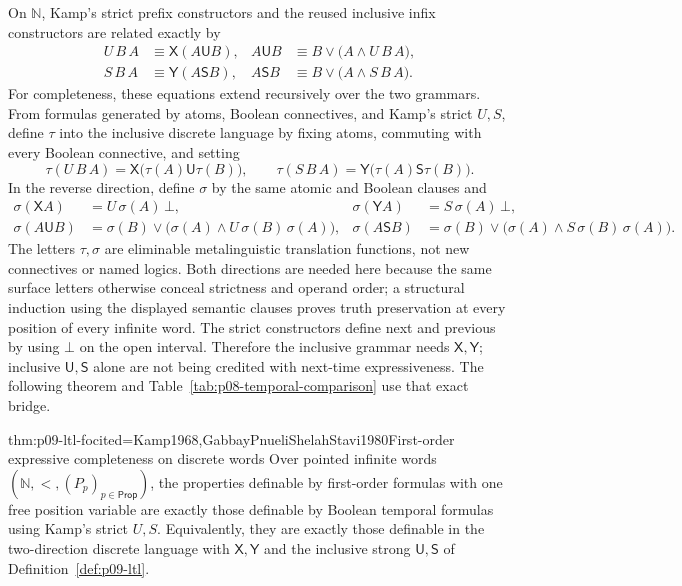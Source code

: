 On \(\mathbb N\), Kamp's strict prefix constructors and the reused inclusive
infix constructors are related exactly by
\[
\begin{aligned}
 U\,B\,A&\equiv\mathsf X(A\mathbin{\mathsf U}B),
 &A\mathbin{\mathsf U}B&\equiv
   B\lor\bigl(A\land U\,B\,A\bigr),\\
 S\,B\,A&\equiv\mathsf Y(A\mathbin{\mathsf S}B),
 &A\mathbin{\mathsf S}B&\equiv
   B\lor\bigl(A\land S\,B\,A\bigr).
\end{aligned}
\]
For completeness, these equations extend recursively over the two grammars.
From formulas generated by atoms, Boolean connectives, and Kamp's strict
\(U,S\), define \(\tau\) into the inclusive discrete language by fixing atoms,
commuting with every Boolean connective, and setting
\[
 \tau(U\,B\,A)=
 \mathsf X\bigl(\tau(A)\mathbin{\mathsf U}\tau(B)\bigr),
 \qquad
 \tau(S\,B\,A)=
 \mathsf Y\bigl(\tau(A)\mathbin{\mathsf S}\tau(B)\bigr).
\]
In the reverse direction, define \(\sigma\) by the same atomic and Boolean
clauses and
\[
\begin{aligned}
 \sigma(\mathsf XA)&=U\,\sigma(A)\,\bot,
 &\sigma(\mathsf YA)&=S\,\sigma(A)\,\bot,\\
 \sigma(A\mathbin{\mathsf U}B)
   &=\sigma(B)\lor
     \bigl(\sigma(A)\land U\,\sigma(B)\,\sigma(A)\bigr),
 &\sigma(A\mathbin{\mathsf S}B)
   &=\sigma(B)\lor
     \bigl(\sigma(A)\land S\,\sigma(B)\,\sigma(A)\bigr).
\end{aligned}
\]
The letters \(\tau,\sigma\) are eliminable metalinguistic translation
functions, not new connectives or named logics.  Both directions are needed
here because the same surface letters otherwise conceal strictness and operand
order; a structural induction using the displayed semantic clauses proves
truth preservation at every position of every infinite word.  The strict
constructors define next and previous by using \(\bot\) on the open interval.
Therefore the inclusive grammar needs \(\mathsf X,\mathsf Y\); inclusive
\(\mathsf U,\mathsf S\) alone are not being credited with next-time
expressiveness.  The following theorem and
Table~\ref{tab:p08-temporal-comparison} use that exact bridge.

\begin{hbtheorem}{thm:p09-ltl-fo}{cited=Kamp1968,GabbayPnueliShelahStavi1980}{First-order expressive completeness on discrete words}
Over pointed infinite words \((\mathbb N,<,(P_p)_{p\in\mathsf{Prop}})\), the
properties definable by first-order formulas with one free position variable
are exactly those definable by Boolean temporal formulas using Kamp's strict
\(U,S\).  Equivalently, they are exactly those definable in the two-direction
discrete language with \(\mathsf X,\mathsf Y\) and the inclusive strong
\(\mathsf U,\mathsf S\) of Definition~\ref{def:p09-ltl}.
\end{hbtheorem}

